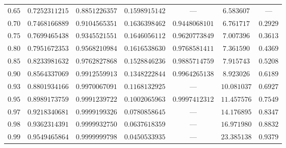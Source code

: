\documentclass[onecolumn,10pt,notitlepage,amsmath,amssymb,floatfix]{revtex4-2}
\theoremstyle{plain}
\theoremstyle{definition}
\begin{document}
\begin{table}[h]
\begin{tabular}{@{}ccccccc@{}}
$0.65$ & $0.7252311215$ & $0.8851226357$ & $0.1598915142$ & ---            & $6.583607$  & --- \\
$0.70$ & $0.7468166889$ & $0.9104565351$ & $0.1636398462$ & $0.9448068101$ & $6.761717$  & $0.2929$ \\
$0.75$ & $0.7699465438$ & $0.9345521551$ & $0.1646056112$ & $0.9620773849$ & $7.007396$  & $0.3613$ \\
$0.80$ & $0.7951672353$ & $0.9568210984$ & $0.1616538630$ & $0.9768581411$ & $7.361590$  & $0.4369$ \\
$0.85$ & $0.8233981632$ & $0.9762827868$ & $0.1528846236$ & $0.9885714759$ & $7.915743$  & $0.5208$ \\
$0.90$ & $0.8564337069$ & $0.9912559913$ & $0.1348222844$ & $0.9964265138$ & $8.923026$  & $0.6189$ \\
$0.93$ & $0.8801934166$ & $0.9970067091$ & $0.1168132925$ & ---            & $10.081037$ & $0.6927$ \\
$0.95$ & $0.8989173759$ & $0.9991239722$ & $0.1002065963$ & $0.9997412312$ & $11.457576$ & $0.7549$ \\
$0.97$ & $0.9218340681$ & $0.9999199326$ & $0.0780858645$ & ---            & $14.176895$ & $0.8347$ \\
$0.98$ & $0.9362314391$ & $0.9999932750$ & $0.0637618359$ & ---            & $16.971980$ & $0.8832$ \\
$0.99$ & $0.9549465864$ & $0.9999999798$ & $0.0450533935$ & ---            & $23.385138$ & $0.9379$ \\
\bottomrule
\end{tabular}
\end{table}
\end{document}
